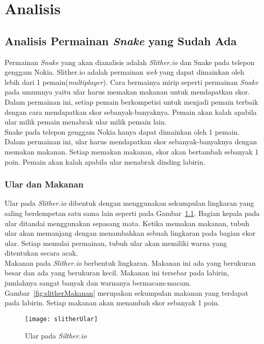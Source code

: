 \chapter{Analisis}
\label{chap:analisis}

\section{Analisis Permainan \textit{Snake} yang Sudah Ada}
Permainan \textit{Snake} yang akan dianalisis adalah \textit{Slither.io} dan Snake pada telepon genggam Nokia. Slither.io adalah permainan \textit{web} yang dapat dimainkan oleh lebih dari 1 pemain(\textit{multiplayer}). Cara bermainya mirip seperti permainan \textit{Snake} pada umumnya yaitu ular harus memakan makanan untuk mendapatkan skor. Dalam permainan ini, setiap pemain berkompetisi untuk menjadi pemain terbaik dengan cara mendapatkan skor sebanyak-banyaknya. Pemain akan kalah apabila ular milik pemain menabrak ular milik pemain lain.\\

Snake pada telepon genggam Nokia hanya dapat dimainkan oleh 1 pemain. Dalam permainan ini, ular harus mendapatkan skor sebanyak-banyaknya dengan memakan makanan. Setiap memakan makanan, skor akan bertambah sebanyak 1 poin. Pemain akan kalah apabila ular menabrak dinding labirin.

\subsection{Ular dan Makanan}
Ular pada \textit{Slither.io} dibentuk dengan menggunakan sekumpulan lingkaran yang saling berdempetan satu sama lain seperti pada Gambar~\ref{fig:slitherUlar}. Bagian kepala pada ular ditandai menggunakan sepasang mata. Ketika memakan makanan, tubuh ular akan memanjang dengan menambahkan sebuah lingkaran pada bagian ekor ular. Setiap memulai permainan, tubuh ular akan memiliki warna yang ditentukan secara acak.\\

Makanan pada \textit{Slither.io} berbentuk lingkaran. Makanan ini ada yang berukuran besar dan ada yang berukuran kecil. Makanan ini tersebar pada labirin, jumlahnya sangat banyak dan warnanya bermacam-macam. Gambar~\ref{fig:slitherMakanan} merupakan sekumpulan makanan yang terdapat pada labirin. Setiap makanan akan menambah skor sebanyak 1 poin.

\begin{figure}[H]
	\centering  
	\texttt{[image: slitherUlar]}  
	\caption[Ular pada \textit{Silther.io}]{Ular pada \textit{Silther.io}}
	\label{fig:slitherUlar} 
\end{figure}

